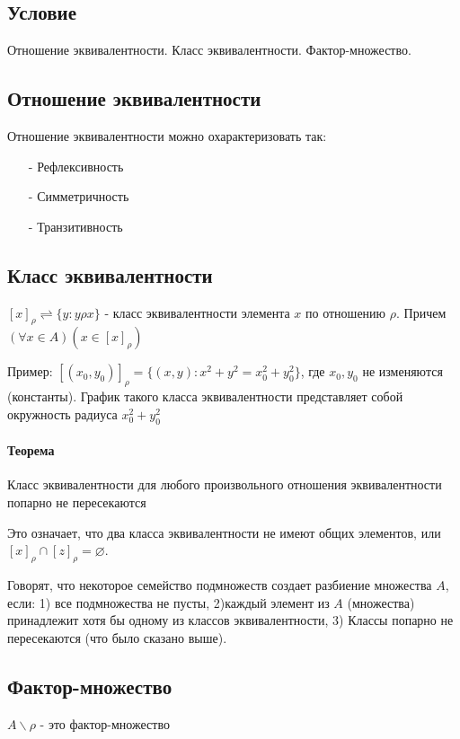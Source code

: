 \documentclass{report}
\begin{document}
\subsection{Условие}
Отношение эквивалентности. Класс эквивалентности. Фактор-множество.

\subsection{Отношение эквивалентности}
Отношение эквивалентности можно охарактеризовать так:
\begin{itemize}
	\item[-] Рефлексивность
	\item[-] Симметричность
	\item[-] Транзитивность
\end{itemize}

\subsection{Класс эквивалентности}
$[x]_{\rho} \rightleftharpoons \{y: y\rho x\}$ - класс эквивалентности элемента $x$ по отношению $\rho$.
Причем $(\forall x \in A)(x \in [x]_{\rho})$

Пример: $[(x_{0},y_{0})]_{\rho} = \{(x,y): x^{2} + y^{2} = x_{0}^{2} + y_{0}^{2}\}$, где $x_{0}, y_{0}$ не изменяются (константы).
График такого класса эквивалентности представляет собой окружность радиуса $x_{0}^{2} + y_{0}^{2}$

\paragraph{Теорема}
Класс эквивалентности для любого произвольного отношения эквивалентности попарно не пересекаются

Это означает, что два класса эквивалентности не имеют общих элементов, или
$[x]_{\rho} \cap [z]_{\rho} = \varnothing$.

Говорят, что некоторое семейство подмножеств создает разбиение множества $A$, если:
1) все подмножества не пусты,
2)каждый элемент из $A$ (множества) принадлежит хотя бы одному из классов эквивалентности,
3) Классы попарно не пересекаются (что было сказано выше).

\subsection{Фактор-множество}
$A\backslash\rho$ - это фактор-множество
\end{document}
